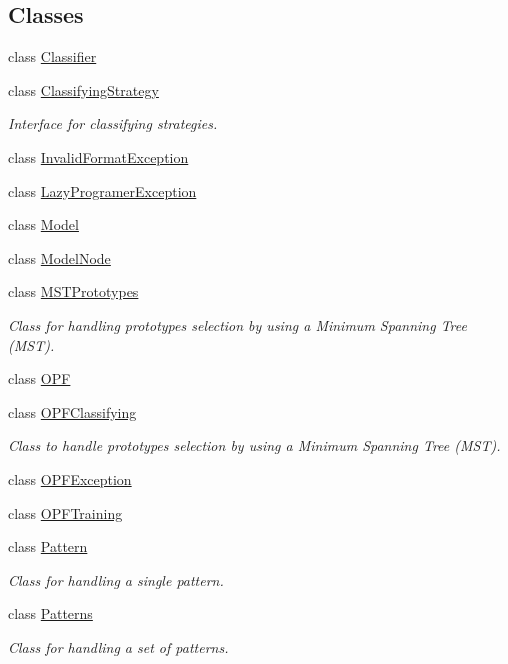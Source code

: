 \subsection*{Classes}
\begin{DoxyCompactItemize}
\item 
class \hyperlink{classopf_1_1Classifier}{Classifier}
\item 
class \hyperlink{classopf_1_1ClassifyingStrategy}{Classifying\+Strategy}
\begin{DoxyCompactList}\small\item\em Interface for classifying strategies. \end{DoxyCompactList}\item 
class \hyperlink{classopf_1_1InvalidFormatException}{Invalid\+Format\+Exception}
\item 
class \hyperlink{classopf_1_1LazyProgramerException}{Lazy\+Programer\+Exception}
\item 
class \hyperlink{classopf_1_1Model}{Model}
\item 
class \hyperlink{classopf_1_1ModelNode}{Model\+Node}
\item 
class \hyperlink{classopf_1_1MSTPrototypes}{M\+S\+T\+Prototypes}
\begin{DoxyCompactList}\small\item\em Class for handling prototypes selection by using a Minimum Spanning Tree (M\+S\+T). \end{DoxyCompactList}\item 
class \hyperlink{classopf_1_1OPF}{O\+P\+F}
\item 
class \hyperlink{classopf_1_1OPFClassifying}{O\+P\+F\+Classifying}
\begin{DoxyCompactList}\small\item\em Class to handle prototypes selection by using a Minimum Spanning Tree (M\+S\+T). \end{DoxyCompactList}\item 
class \hyperlink{classopf_1_1OPFException}{O\+P\+F\+Exception}
\item 
class \hyperlink{classopf_1_1OPFTraining}{O\+P\+F\+Training}
\item 
class \hyperlink{classopf_1_1Pattern}{Pattern}
\begin{DoxyCompactList}\small\item\em Class for handling a single pattern. \end{DoxyCompactList}\item 
class \hyperlink{classopf_1_1Patterns}{Patterns}
\begin{DoxyCompactList}\small\item\em Class for handling a set of patterns. \end{DoxyCompactList}\item 

\end{DoxyCompactItemize}
